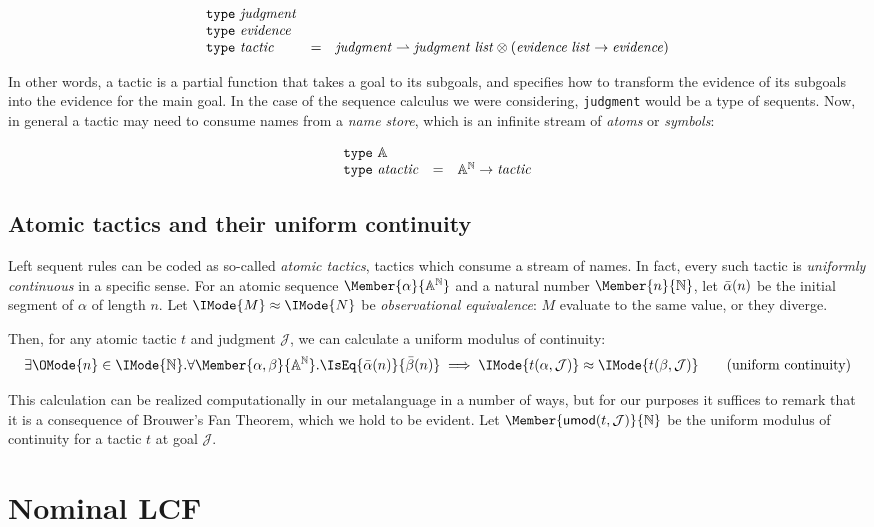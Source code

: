 \[
  \begin{array}{lcl}
    \mathtt{type}\ \mathit{judgment}\\
    \mathtt{type}\ \mathit{evidence}\\
    \mathtt{type}\ \mathit{tactic} &= &\mathit{judgment}\rightharpoonup \mathit{judgment}\;\mathit{list} \otimes (\mathit{evidence}\;\mathit{list}\to\mathit{evidence})
  \end{array}
\]

In other words, a tactic is a partial function that takes a goal to its
subgoals, and specifies how to transform the evidence of its subgoals into the
evidence for the main goal. In the case of the sequence calculus we were
considering, \verb!judgment! would be a type of sequents.  Now, in general a
tactic may need to consume names from a \emph{name store}, which is an infinite
stream of \emph{atoms} or \emph{symbols}:

\[
  \begin{array}{lcl}
    \mathtt{type}\ \mathbb{A}\\
    \mathtt{type}\ \mathit{atactic} &= &{\mathbb{A}}^{\mathbb{N}} \to \mathit{tactic}
  \end{array}
\]

\newcommand\KleeneEq[2]{\IMode{#1}\approx \IMode{#2}}
\newcommand\UMod[2]{\mathsf{umod}(#1,#2)}

\subsection{Atomic tactics and their uniform continuity}

Left sequent rules can be coded as so-called \emph{atomic tactics}, tactics which
consume a stream of names. In fact, every such tactic is \emph{uniformly
continuous} in a specific sense. For an atomic sequence
$\Member{\alpha}{\MLStream{\MLAtom}}$ and a natural number
$\Member{n}{\MLNat}$, let $\bar{\alpha}(n)$ be the initial segment of
$\alpha$ of length $n$. Let $\KleeneEq{M}{N}$ be \emph{observational equivalence}:
$M$ evaluate to the same value, or they diverge.

Then, for any atomic tactic $t$ and judgment $\mathcal{J}$, we can calculate a
uniform modulus of continuity:
\begin{equation}
  \exists \OMode{n}\in\IMode{\MLNat}.
  \forall \Member{\alpha,\beta}{\MLStream{\MLAtom}}.
    \IsEq{\bar{\alpha}(n)}{\bar{\beta}(n)}\implies \KleeneEq{t(\alpha,\mathcal{J})}{t(\beta,\mathcal{J})}
  \tag{uniform continuity}
\end{equation}

This calculation can be realized computationally in our metalanguage in a
number of ways, but for our purposes it suffices to remark that it is a
consequence of Brouwer's Fan Theorem, which we hold to be evident. Let
$\Member{\UMod{t}{\mathcal{J}}}{\MLNat}$ be the uniform modulus of continuity
for a tactic $t$ at goal $\mathcal{J}$.

\section{Nominal LCF}

